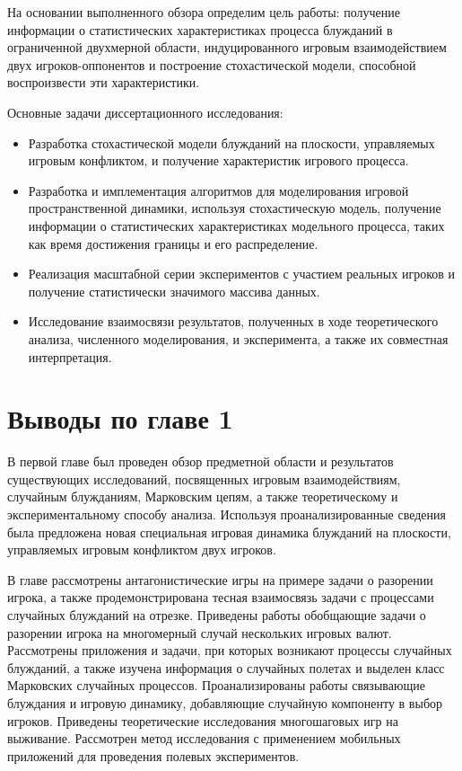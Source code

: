 На основании выполненного обзора определим цель работы: получение информации о статистических
характеристиках процесса блужданий в ограниченной двухмерной области, индуцированного игровым
взаимодействием двух игроков-оппонентов и построение стохастической модели, способной воспроизвести эти характеристики.

Основные задачи диссертационного исследования:
\begin{itemize}
    \item Разработка стохастической модели блужданий на плоскости, управляемых
    игровым конфликтом, и получение характеристик игрового процесса.
    \item Разработка и имплементация алгоритмов для моделирования
    игровой пространственной динамики, используя стохастическую
    модель, получение информации о статистических характеристиках
    модельного процесса, таких как время достижения границы и его
    распределение.
    \item Реализация масштабной серии экспериментов с участием
    реальных игроков и получение статистически значимого массива
    данных.
    \item Исследование взаимосвязи результатов, полученных в ходе
    теоретического анализа, численного моделирования, и эксперимента, а
    также их совместная интерпретация.
\end{itemize}

\section{Выводы по главе 1}\label{sec:ch1/sec5}

В первой главе был проведен обзор предметной области и результатов
существующих исследований, посвященных игровым взаимодействиям, случайным блужданиям,
Марковским цепям, а также теоретическому и экспериментальному способу анализа.
Используя проанализированные сведения была предложена новая специальная игровая динамика блужданий
на плоскости, управляемых игровым конфликтом двух игроков.

В главе рассмотрены антагонистические игры на примере задачи о разорении игрока, а также
продемонстрирована тесная взаимосвязь задачи с процессами случайных блужданий на отрезке.
Приведены работы обобщающие задачи о разорении игрока на многомерный случай нескольких игровых валют.
Рассмотрены приложения и задачи, при которых возникают процессы случайных блужданий, а также 
изучена информация о случайных полетах и выделен класс Марковских случайных процессов.
Проанализированы работы связывающие блуждания и игровую динамику, добавляющие случайную компоненту
в выбор игроков. Приведены теоретические исследования многошаговых игр на выживание.
Рассмотрен метод исследования с применением мобильных приложений для проведения полевых экспериментов.

